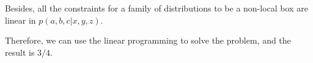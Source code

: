 \documentclass[12pt]{article}
\begin{document}
\begin{enumerate}
\begin{enumerate}
Besides, all the constraints for a family of distributions to be a non-local box are linear in $p(a, b, c| x, y, z)$.

Therefore, we can use the linear programming to solve the problem, and the result is $3/4$.

\end{enumerate}


\end{enumerate}
\end{document}

